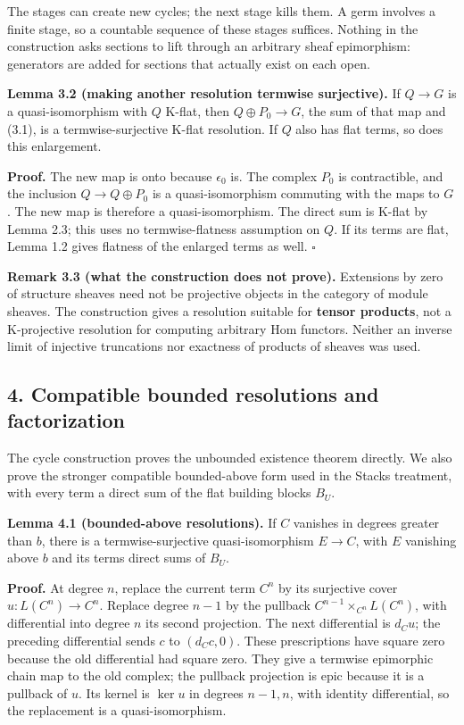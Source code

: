 \documentclass[
  english,
  11pt,
  a4paper,
]{article}
\begin{document}
The stages can create new cycles; the next stage kills them. A germ
involves a finite stage, so a countable sequence of these stages
suffices. Nothing in the construction asks sections to lift through an
arbitrary sheaf epimorphism: generators are added for sections that
actually exist on each open.

\textbf{Lemma 3.2 (making another resolution termwise surjective).} If
\(Q\to G\) is a quasi-isomorphism with \(Q\) K-flat, then
\(Q\oplus P_0\to G\), the sum of that map and (3.1), is a
termwise-surjective K-flat resolution. If \(Q\) also has flat terms, so
does this enlargement.

\textbf{Proof.} The new map is onto because \(\epsilon_0\) is. The
complex \(P_0\) is contractible, and the inclusion \(Q\to Q\oplus P_0\)
is a quasi-isomorphism commuting with the maps to \(G\). The new map is
therefore a quasi-isomorphism. The direct sum is K-flat by Lemma 2.3;
this uses no termwise-flatness assumption on \(Q\). If its terms are
flat, Lemma 1.2 gives flatness of the enlarged terms as well.
\(\square\)

\textbf{Remark 3.3 (what the construction does not prove).} Extensions
by zero of structure sheaves need not be projective objects in the
category of module sheaves. The construction gives a resolution suitable
for \textbf{tensor products}, not a K-projective resolution for
computing arbitrary Hom functors. Neither an inverse limit of injective
truncations nor exactness of products of sheaves was used.

\subsection{4. Compatible bounded resolutions and
factorization}\label{flat-modules-and-k-flat-resolutions--4-compatible-bounded-resolutions-and-factorization}

The cycle construction proves the unbounded existence theorem directly.
We also prove the stronger compatible bounded-above form used in the
Stacks treatment, with every term a direct sum of the flat building
blocks \(B_U\).

\textbf{Lemma 4.1 (bounded-above resolutions).} If \(C\) vanishes in
degrees greater than \(b\), there is a termwise-surjective
quasi-isomorphism \(E\to C\), with \(E\) vanishing above \(b\) and its
terms direct sums of \(B_U\).

\textbf{Proof.} At degree \(n\), replace the current term \(C^n\) by its
surjective cover \(u:L(C^n)\to C^n\). Replace degree \(n-1\) by the
pullback \(C^{n-1}\times_{C^n}L(C^n)\), with differential into degree
\(n\) its second projection. The next differential is \(d_Cu\); the
preceding differential sends \(c\) to \((d_Cc,0)\). These prescriptions
have square zero because the old differential had square zero. They give
a termwise epimorphic chain map to the old complex; the pullback
projection is epic because it is a pullback of \(u\). Its kernel is
\(\ker u\) in degrees \(n-1,n\), with identity differential, so the
replacement is a quasi-isomorphism.
\end{document}
